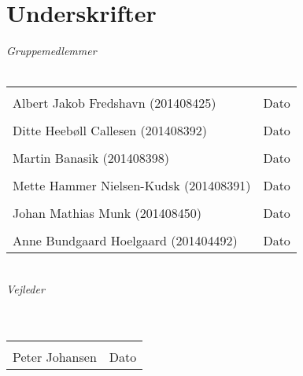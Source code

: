 \chapter{Underskrifter}

\begin{vplace}[0.6]

{\large \textit{Gruppemedlemmer}}
\\
\\

\noindent \begin{tabular}{ll}
	\makebox[3.0in]{\hrulefill} & \makebox[1.5in]{\hrulefill}\\
	Albert Jakob Fredshavn  (201408425) & Dato\\[7ex]%
	\makebox[3in]{\hrulefill} & \makebox[1.5in]{\hrulefill}\\
	Ditte Heebøll Callesen  (201408392) & Dato\\[7ex]
	\makebox[3in]{\hrulefill} & \makebox[1.5in]{\hrulefill}\\
	Martin Banasik  (201408398) & Dato\\[7ex]
	\makebox[3in]{\hrulefill} & \makebox[1.5in]{\hrulefill}\\
	Mette Hammer Nielsen-Kudsk  (201408391) & Dato\\[7ex]
	\makebox[3in]{\hrulefill} & \makebox[1.5in]{\hrulefill}\\
	Johan Mathias Munk  (201408450) & Dato\\[7ex]
	\makebox[3in]{\hrulefill} & \makebox[1.5in]{\hrulefill}\\
	Anne Bundgaard Hoelgaard (201404492) & Dato\\[7ex]
	
	
\end{tabular}
\\
{\large \textit{Vejleder}}
\\
\\
\\
\noindent \begin{tabular}{ll}
	\makebox[3.0in]{\hrulefill} & \makebox[1.5in]{\hrulefill}\\
	Peter Johansen & Dato\\[8ex]
\end{tabular}
\end{vplace}
